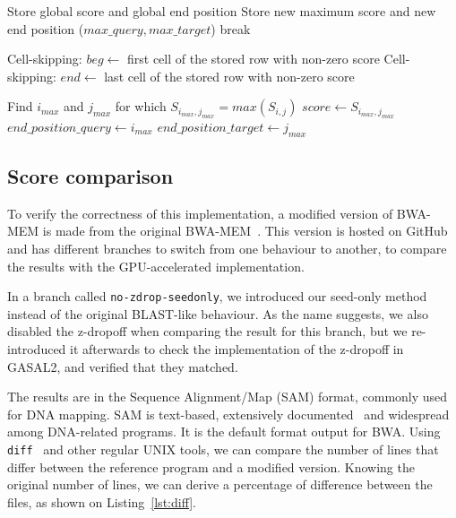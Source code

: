 \begin{algorithm}[h!]
\begin{algorithmic}[1]
		
		\EndFor %
		\EndFor %
		\State Store global score and global end position
		\EndIf
		\State Store new maximum score and new end position ($max\_query, max\_target$)
		\State break
		\EndIf
		\EndIf
		
		\State Cell-skipping: $beg \leftarrow$ first cell of the stored row with non-zero score
		\State Cell-skipping: $end \leftarrow$ last cell of the stored row with non-zero score
		\EndFor %
		\EndFor %
		
		\State Find $i_{max}$ and $j_{max}$ for which $S_{i_{max}, j_{max}} = max(S_{i,j})$
		\State $score \leftarrow S_{i_{max}, j_{max}}$
		\State $end\_position\_query \leftarrow i_{max}$
		\State $end\_position\_target \leftarrow j_{max}$
		
		\EndProcedure
		
	\end{algorithmic}
\end{algorithm}


\subsection{Score comparison}

To verify the correctness of this implementation, a modified version of BWA-MEM is made from the original BWA-MEM~\cite{lh3:bwa}. This version is hosted on GitHub~\cite{j-levy:bwa} and has different branches to switch from one behaviour to another, to compare the results with the GPU-accelerated implementation.

In a branch called \verb|no-zdrop-seedonly|, we introduced our seed-only method instead of the original BLAST-like behaviour. As the name suggests, we also disabled the z-dropoff when comparing the result for this branch, but we re-introduced it afterwards to check the implementation of the z-dropoff in GASAL2, and verified that they matched.

The results are in the Sequence Alignment/Map (SAM) format, commonly used for DNA mapping. SAM is text-based, extensively documented~\cite{samtools:sam} and widespread among DNA-related programs. It is the default format output for BWA. Using \verb|diff|~\cite{misc:gnudiff} and other regular UNIX tools, we can compare the number of lines that differ between the reference program and a modified version. Knowing the original number of lines, we can derive a percentage of difference between the files, as shown on Listing~\ref{lst:diff}.

